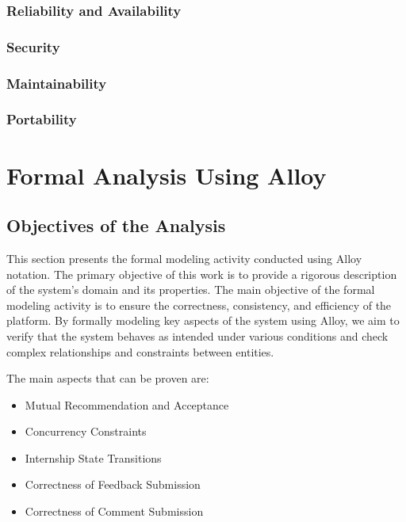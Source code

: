 \documentclass{article}
\begin{document}
\subsubsection{Reliability and Availability}
\subsubsection{Security}
\subsubsection{Maintainability}
\subsubsection{Portability}

\section{Formal Analysis Using Alloy}
\subsection{Objectives of the Analysis}
This section presents the formal modeling activity conducted using Alloy notation. The primary objective of this work is to provide a rigorous description of the system's domain and its properties.
The main objective of the formal modeling activity is to ensure the correctness, consistency, and efficiency of the platform. By formally modeling key aspects of the system using Alloy, we aim to verify that the system behaves as intended under various conditions and check complex relationships and constraints between entities.

The main aspects that can be proven are:
\begin{itemize}
    \item Mutual Recommendation and Acceptance
    \item Concurrency Constraints
    \item Internship State Transitions
    \item Correctness of Feedback Submission
    \item Correctness of Comment Submission
\end{itemize}
\end{document}
